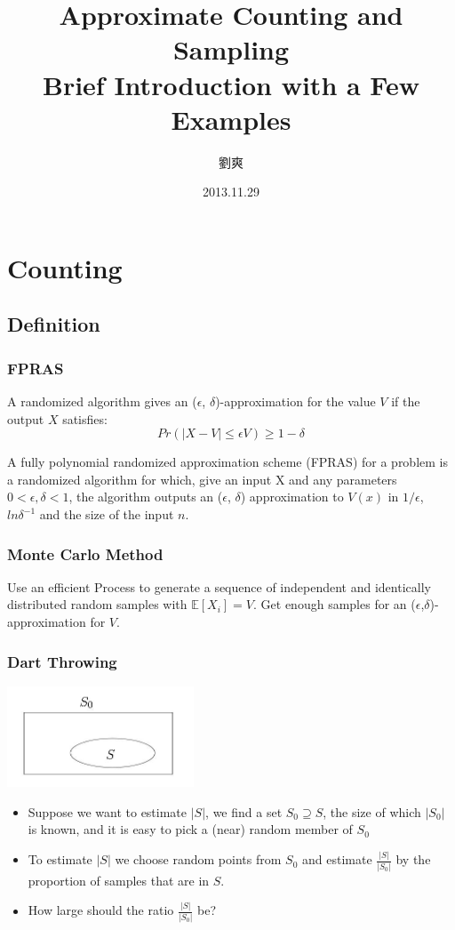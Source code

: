 \documentclass[table, usenames,dvipsnames,svgnames]{beamer}
\title[Approximate Counting and Sampling]{\Large{Approximate Counting and Sampling}\\\vspace{2mm}\normalsize{Brief Introduction with a Few Examples}}
\author[LIU Shuang]{劉爽}
\institute[SJTU ZY ACM 2012]{上海交通大學致遠學院2012級ACM班}
\date[2013.11.29]{2013.11.29}
\begin{document}
\begin{frame}
    \titlepage
\end{frame}

\section{Counting}

\subsection{Definition}
\begin{frame}
    \frametitle{FPRAS}
    \pause
    \begin{definition}
        A randomized algorithm gives an ($\epsilon$, $\delta$)-approximation for the value $V$ if the output $X$ satisfies:
        $$
        Pr(|X - V|\leq \epsilon V) \geq 1 - \delta
        $$
    \end{definition}
    \pause
    \begin{definition}[FPRAS]
        A fully polynomial randomized approximation scheme (FPRAS) for a problem is a randomized algorithm for which, give an input X and any parameters $0 < \epsilon, \delta < 1$, the algorithm outputs an ($\epsilon$, $\delta$) approximation to $V(x)$ in $1/\epsilon$, $ln\delta^{-1}$ and the size of the input $n$.
    \end{definition}
\end{frame}

\begin{frame}
    \frametitle{Monte Carlo Method}
    \pause
    \begin{definition}
        Use an efficient Process to generate a sequence of independent and identically distributed random samples with $\mathbb{E}[X_i] = V$. Get enough samples for an ($\epsilon$,$\delta$)-approximation for $V$.
    \end{definition}
\end{frame}

\begin{frame}
    \frametitle{Dart Throwing}
    \pause
    \includegraphics[height=30mm]{dart.jpg}
    \pause
    \begin{itemize}
        \item Suppose we want to estimate $|S|$, we find a set $S_0 \supseteq S$, the size of which $|S_0|$ is known, and it is easy to pick a (near) random member of $S_0$
            \pause
        \item To estimate $|S|$ we choose random points from $S_0$ and estimate $\frac{|S|}{|S_0|}$ by the proportion of samples that are in $S$.\pause
        \item How large should the ratio $\frac{|S|}{|S_0|}$ be?
    \end{itemize}
\end{frame}
\end{document}
